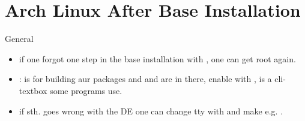 
\section{Arch Linux After Base Installation}

\begin{frame}[fragile]{General}
  \begin{itemize}
    \item if one forgot one step in the base installation with , one can get root again.
    \item {\tiny{}}:  is for building aur packages and  and  are in there, enable  with ,  is a cli-textbox some programs use.
    \item if sth. goes wrong with the DE one can change tty with  and make e.g. .
  \end{itemize}
\end{frame}


